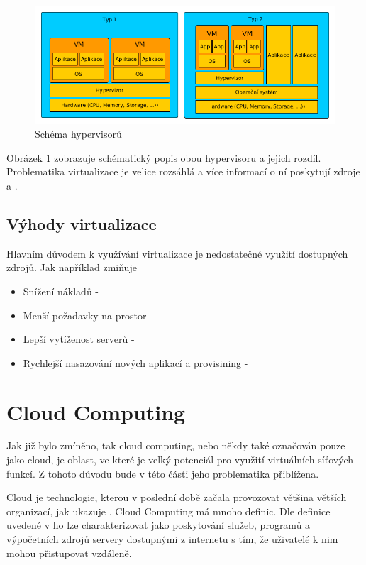 \begin{figure}[h]
\begin{centering}
\includegraphics[scale=0.5]{images/virtualization}
\par\end{centering}
\caption{Schéma hypervisorů \label{fig:virtualization}}
\end{figure}

Obrázek \ref{fig:virtualization} zobrazuje schématický popis obou hypervisoru a jejich rozdíl. Problematika virtualizace je velice rozsáhlá a více informací o ní poskytují zdroje \cite{VM_book} a \cite{VM_architektura}.

\subsection{Výhody virtualizace}

Hlavním důvodem k využívání virtualizace je nedostatečné využití dostupných zdrojů. Jak například zmiňuje \cite{}

\begin{itemize}
\item Snížení nákladů - 
\item Menší požadavky na prostor - 
\item Lepší vytíženost serverů -
\item Rychlejší nasazování nových aplikací a provisining -
\end{itemize}

\section{Cloud Computing}

Jak již bylo zmíněno, tak cloud computing, nebo někdy také označován pouze jako cloud, je oblast, ve které je velký potenciál pro využití virtuálních síťových funkcí. Z tohoto důvodu bude v této části jeho problematika přiblížena.

Cloud je technologie, kterou v poslední době začala provozovat většina větších organizací, jak ukazuje \cite{Cloud_adoption}. Cloud Computing má mnoho definic. Dle definice uvedené v \cite{Cloud_book} ho lze charakterizovat jako poskytování služeb, programů a výpočetních zdrojů servery dostupnými z internetu s tím, že uživatelé k nim mohou přistupovat vzdáleně.

